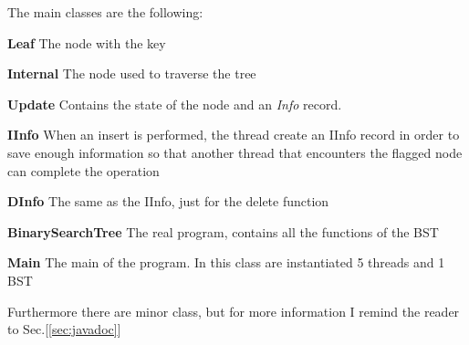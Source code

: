 \documentclass[a4paper]{article}
\begin{document}
\noindent
The main classes are the following:
\begin{compactitem}
  \item \textbf{Leaf} The node with the key
  \item \textbf{Internal} The node used to traverse the tree
  \item \textbf{Update} Contains the state of the node and an \emph{Info} record.
  \item \textbf{IInfo} When an insert is performed, the thread create an IInfo record in order to save enough information so that another thread that encounters the flagged node can complete the operation
  \item \textbf{DInfo} The same as the IInfo, just for the delete function
  \item \textbf{BinarySearchTree} The real program, contains all the functions of the \ac{BST}
  \item \textbf{Main} The main of the program. In this class are instantiated 5 threads and 1 \ac{BST}
\end{compactitem}

\noindent

Furthermore there are minor class, but for more information I remind the reader to Sec.[\ref{sec:javadoc}]
\end{document}
